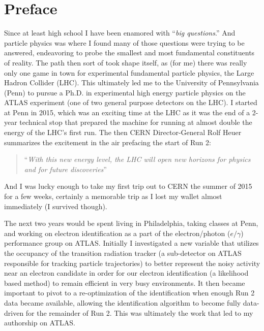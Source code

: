 \chapter{Preface}
Since at least high school I have been enamored with ``\emph{big questions}.''
And particle physics was where I found many of those questions were trying to be answered, endeavoring to probe the smallest and most fundamental constituents of reality.
The path then sort of took shape itself, as (for me) there was really only one game in town for experimental fundamental particle physics, the Large Hadron Collider (LHC).
This ultimately led me to the University of Pennsylvania (Penn) to pursue a Ph.D. in experimental high energy particle physics on the ATLAS experiment (one of two general purpose detectors on the LHC).
I started at Penn in 2015, which was an exciting time at the LHC as it was the end of a 2-year technical stop that prepared the machine for running at almost double the energy of the LHC’s first run.
The then CERN Director-General Rolf Heuer summarizes the excitement in the air prefacing the start of Run 2:
\begin{quote}
    ``\emph{With this new energy level, the LHC will open new horizons for physics and for future discoveries}''
\end{quote}
And I was lucky enough to take my first trip out to CERN the summer of 2015 for a few weeks, certainly a memorable trip as I lost my wallet almost immediately (I survived though).

The next two years would be spent living in Philadelphia, taking classes at Penn, and working on electron identification as a part of the electron/photon ($e/\gamma$) performance group on ATLAS.  
Initially I investigated a new variable that utilizes the occupancy of the transition radiation tracker (a sub-detector on ATLAS responsible for tracking particle trajectories) to better represent the noisy activity near an electron candidate in order for our electron identification (a likelihood based method) to remain efficient in very busy environments.
It then became important to pivot to a re-optimization of the identification when enough Run 2 data became available, allowing the identification algorithm to become fully data-driven for the remainder of Run 2.
This was ultimately the work that led to my authorship on ATLAS.

